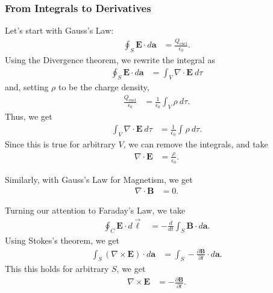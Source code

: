 \documentclass[10pt]{mypackage}
\begin{document}
\subsubsection{From Integrals to Derivatives}%
\begin{derivation}
Let's start with Gauss's Law:
\begin{align*}
  \oint_{S}\mathbf{E}\cdot d\mathbf{a} &= \frac{Q_{\text{encl}}}{\epsilon_0}.
\end{align*}
Using the Divergence theorem, we rewrite the integral as
\begin{align*}
  \oint_{S}\mathbf{E}\cdot d\mathbf{a} &= \int_{V}\nabla \cdot \mathbf{E}\:d\tau
\end{align*}
and, setting $\rho$ to be the charge density,
\begin{align*}
  \frac{Q_{\text{encl}}}{\epsilon_0} &= \frac{1}{\epsilon_0}\int_{V}^{} \rho\:d\tau.
\end{align*}
Thus, we get
\begin{align*}
  \int_{V}^{} \nabla \cdot \mathbf{E}\:d\tau &= \frac{1}{\epsilon_0}\int_{}^{} \rho\:d\tau.
\end{align*}
Since this is true for arbitrary $V$, we can remove the integrals, and take
\begin{align*}
  \nabla \cdot \mathbf{E} &= \frac{\rho}{\epsilon_0}.
\end{align*}
\end{derivation}
\begin{derivation}
Similarly, with Gauss's Law for Magnetism, we get
\begin{align*}
  \nabla \cdot \mathbf{B} &= 0.
\end{align*}
\end{derivation}
\begin{derivation}
Turning our attention to Faraday's Law, we take
\begin{align*}
  \oint_{C}\mathbf{E}\cdot d\vec{\ell} &= -\frac{d}{dt}\int_{S}\mathbf{B}\cdot d\mathbf{a}.
\end{align*}
Using Stokes's theorem, we get
\begin{align*}
  \int_{S}\left(\nabla \times \mathbf{E}\right)\cdot d\mathbf{a} &= \int_{S}-\frac{\partial \mathbf{B}}{\partial t}\cdot d\mathbf{a}.
\end{align*}
This this holds for arbitrary $S$, we get
\begin{align*}
  \nabla \times \mathbf{E} &= -\frac{\partial \mathbf{B}}{\partial t}.
\end{align*}
\end{derivation}
\end{document}

